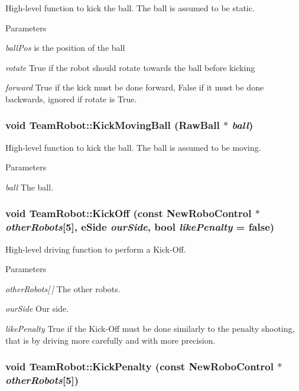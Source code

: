 High-\/level function to kick the ball. The ball is assumed to be static. 


\begin{DoxyParams}{Parameters}
\item[{\em ballPos}]is the position of the ball \item[{\em rotate}]True if the robot should rotate towards the ball before kicking \item[{\em forward}]True if the kick must be done forward, False if it must be done backwards, ignored if rotate is True. \end{DoxyParams}
\hypertarget{classTeamRobot_a98d044ad3907493236b2d399a26cb9ac}{
\subsubsection[{KickMovingBall}]{\setlength{\rightskip}{0pt plus 5cm}void TeamRobot::KickMovingBall (RawBall $\ast$ {\em ball})}}
\label{classTeamRobot_a98d044ad3907493236b2d399a26cb9ac}


High-\/level function to kick the ball. The ball is assumed to be moving. 


\begin{DoxyParams}{Parameters}
\item[{\em ball}]The ball. \end{DoxyParams}
\hypertarget{classTeamRobot_a162c8b33d4315a61d8371dc9a923b37b}{
\subsubsection[{KickOff}]{\setlength{\rightskip}{0pt plus 5cm}void TeamRobot::KickOff (const {\bf NewRoboControl} $\ast$ {\em otherRobots}\mbox{[}5\mbox{]}, \/  eSide {\em ourSide}, \/  bool {\em likePenalty} = {\ttfamily false})}}
\label{classTeamRobot_a162c8b33d4315a61d8371dc9a923b37b}


High-\/level driving function to perform a Kick-\/Off. 


\begin{DoxyParams}{Parameters}
\item[{\em otherRobots\mbox{[}$\,$\mbox{]}}]The other robots. \item[{\em ourSide}]Our side. \item[{\em likePenalty}]True if the Kick-\/Off must be done similarly to the penalty shooting, that is by driving more carefully and with more precision. \end{DoxyParams}
\hypertarget{classTeamRobot_ad5755055df84960c8d1a0a40efe33668}{
\subsubsection[{KickPenalty}]{\setlength{\rightskip}{0pt plus 5cm}void TeamRobot::KickPenalty (const {\bf NewRoboControl} $\ast$ {\em otherRobots}\mbox{[}5\mbox{]})}}
\label{classTeamRobot_ad5755055df84960c8d1a0a40efe33668}


